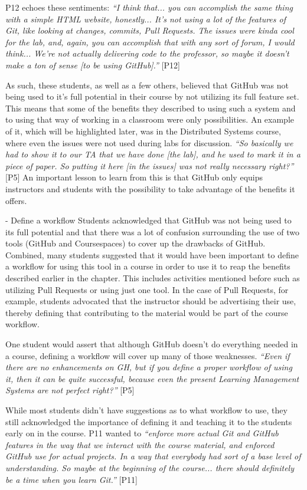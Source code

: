 P12 echoes these sentiments: \textit{``I think that... you can accomplish the same thing with a simple HTML website, honestly... It's not using a lot of the features of Git, like looking at changes, commits, Pull Requests. The issues were kinda cool for the lab, and, again, you can accomplish that with any sort of forum, I would think... We're not actually delivering code to the professor, so maybe it doesn't make a ton of sense [to be using GitHub].''} [P12]

As such, these students, as well as a few others, believed that GitHub was not being used to it's full potential in their course by not utilizing its full feature set. This means that some of the benefits they described to using such a system and to using that way of working in a classroom were only possibilities. An example of it, which will be highlighted later, was in the Distributed Systems course, where even the issues were not used during labs for discussion. \textit{``So basically we had to show it to our TA that we have done [the lab], and he used to mark it in a piece of paper. So putting it here [in the issues] was not really necessary right?''} [P5] An important lesson to learn from this is that GitHub only equips instructors and students with the possibility to take advantage of the benefits it offers. %

- Define a workflow
Students acknowledged that GitHub was not being used to its full potential and that there was a lot of confusion surrounding the use of two tools (GitHub and Coursespaces) to cover up the drawbacks of GitHub. Combined, many students suggested that it would have been important to define a workflow for using this tool in a course in order to use it to reap the benefits described earlier in the chapter. This includes activities mentioned before such as utilizing Pull Requests or using just one tool. In the case of Pull Requests, for example, students advocated that the instructor should be advertising their use, thereby defining that contributing to the material would be part of the course workflow.

One student would assert that although GitHub doesn't do everything needed in a course, defining a workflow will cover up many of those weaknesses. \textit{``Even if there are no enhancements on GH, but if you define a proper workflow of using it, then it can be quite successful, because even the present Learning Management Systems are not perfect right?''} [P5]

While most students didn't have suggestions as to what workflow to use, they still acknowledged the importance of defining it and teaching it to the students early on in the course. P11 wanted to \textit{``enforce more actual Git and GitHub features in the way that we interact with the course material, and enforced GitHub use for actual projects. In a way that everybody had sort of a base level of understanding. So maybe at the beginning of the course... there should definitely be a time when you learn Git.''} [P11]

